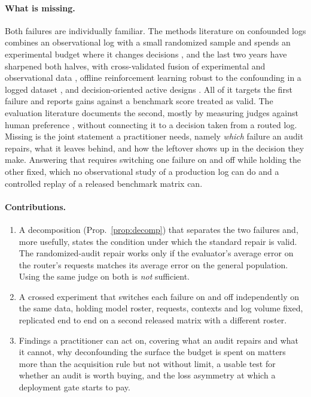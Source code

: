 \documentclass{article}
\theoremstyle{plain}
\theoremstyle{remark}
\begin{document}
\paragraph{What is missing.} Both failures are individually familiar. The methods literature on
confounded logs combines an observational log with a small randomized sample and spends an
experimental budget where it changes decisions
\citep{athey2020combining,kallus2018removing,rosenman2022propensity}, and the last two years have
sharpened both halves, with cross-validated fusion of experimental and observational data
\citep{yang2025crossvalidated}, offline reinforcement learning robust to the confounding in a logged
dataset \citep{li2025confounding}, and decision-oriented active designs
\citep{cha2025abc3,gao2025causalepig,gao2026observationally,gao2026budgeted}. All of it targets the
first failure and reports gains against a benchmark score treated as valid. The evaluation literature
documents the second, mostly by measuring judges against human preference
\citep{chiang2024arena}, without connecting it to a decision taken from a routed log. Missing is the joint statement a practitioner
needs, namely \emph{which} failure an audit repairs, what it leaves behind, and how the leftover
shows up in the decision they make. Answering that requires switching one failure on and off while
holding the other fixed, which no observational study of a production log can do and a controlled
replay of a released benchmark matrix can.

\paragraph{Contributions.}
\begin{enumerate}[leftmargin=1.4em,itemsep=1pt,topsep=2pt]
\item A decomposition (Prop.~\ref{prop:decomp}) that separates the two failures and, more usefully,
states the condition under which the standard repair is valid. The randomized-audit repair works only
if the evaluator's average error on the router's requests matches its average error on the general
population. Using the same judge on both is \emph{not} sufficient.
\item A crossed experiment that switches each failure on and off independently on the same data,
holding model roster, requests, contexts and log volume fixed, replicated end to end on a second
released matrix with a different roster.
\item Findings a practitioner can act on, covering what an audit repairs and what it cannot, why
deconfounding the surface the budget is spent on matters more than the acquisition rule but not
without limit, a usable test for whether an audit is worth buying, and the loss asymmetry at which a
deployment gate starts to pay.
\end{enumerate}
\end{document}

